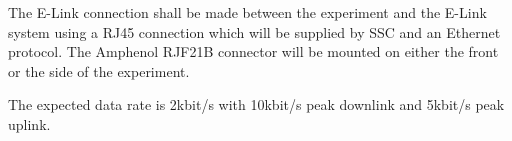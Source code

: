\begin{centering}
The E-Link connection shall be made between the experiment and the E-Link system using a RJ45 connection which will be supplied by SSC and an Ethernet protocol. The Amphenol RJF21B connector will be mounted on either the front or the side of the experiment\cite{BexusManual}.  
\end{centering}
\bigskip

\begin{centering}
The expected data rate is 2kbit/s with 10kbit/s peak downlink and 5kbit/s peak uplink.
\end{centering}

\raggedbottom